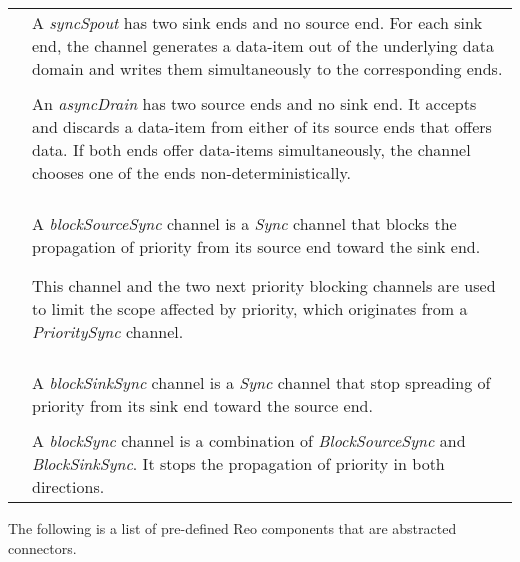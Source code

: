 \begin{table}[H]
\begin{tabular}{cp{10cm}}
  \raisebox{-.18cm}{\syncspout} & A  \emph{syncSpout} has two sink ends and no source end. For each sink end,  the channel generates a data-item out of the underlying data domain  and writes them simultaneously to the corresponding ends.
  \\%
  & \\
  \raisebox{-.2cm}{\asyncdrain} & An \emph{asyncDrain} has two source ends and no sink end. It accepts and discards a data-item from either of its source ends that offers data. If both ends offer data-items simultaneously, the channel chooses one of the ends non-deterministically.     
\\ %
%
& \\ 
\raisebox{-.25cm}{\bcsync} & A \emph{blockSourceSync} channel is a  \emph{Sync} channel that blocks the propagation of priority from its source end toward the sink end. 

This channel and the two next priority blocking channels are used to limit the scope affected by priority, which originates from a \emph{PrioritySync} channel. \\ %
& \\
\raisebox{-.23cm}{\bksync} &  A \emph{blockSinkSync}  channel is a  \emph{Sync} channel that stop  spreading of priority from its sink end toward the source end.
\\ %
& \\
\raisebox{-.22cm}{\bsync} & A \emph{blockSync}  channel is a combination of \emph{BlockSourceSync} and \emph{BlockSinkSync}. It stops the propagation of priority in both directions.\\
\end{tabular}
\end{table}

The following is a list of pre-defined Reo components that are abstracted connectors. 

